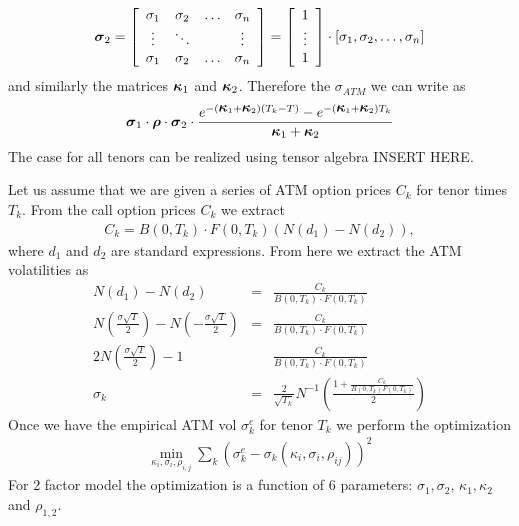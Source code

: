 \documentclass[12pt]{article}
\begin{document}
\begin{eqnarray*}
  \mbox {\boldmath ${\sigma}$}_2 = \left[ \begin{array}{cccc}
      \sigma_1 & \sigma_2 & \ldots & \sigma_n 
      \\
      \vdots & \ddots & & \vdots 
      \\
      \sigma_1 & \sigma_2 & \ldots & \sigma_n
    \end{array} 
  \right]
  = \left[ \begin{array}{c}
      1
      \\
      \vdots 
      \\
      1
    \end{array} 
  \right]
  \cdot 
  \left[ \sigma_1, \sigma_2, \ldots , \sigma_n \right]
\end{eqnarray*}
and similarly the matrices $\mbox {\boldmath ${\kappa}$}_1$ and $\mbox {\boldmath ${\kappa}$}_2$. 
Therefore the $\sigma_{ATM}$ we can write as 
\begin{eqnarray*}
  \mbox {\boldmath ${\sigma}$}_1 \cdot \mbox {\boldmath ${\rho}$} \cdot \mbox {\boldmath ${\sigma}$}_2  \cdot 
  \frac { e^{- (\mbox {\boldmath ${\kappa}$}_1 + \mbox {\boldmath ${\kappa}$}_2 ) (T_k - T)  } - e^{- (\mbox {\boldmath ${\kappa}$}_1 + \mbox {\boldmath ${\kappa}$}_2 ) T_k } }
    {\mbox {\boldmath ${\kappa}$}_1 + \mbox {\boldmath ${\kappa}$}_2 } 
\end{eqnarray*}
The case for all tenors can be realized using tensor algebra INSERT HERE. 

\vskip 5mm
%
\noindent
Let us assume that we are given a series of ATM option prices $C_k$ for tenor times $T_k$. From the call option prices $C_k$ we extract 
\begin{eqnarray*}
  C_k = B(0,T_k) \cdot F(0,T_k) ( N(d_1) - N(d_2) ),
\end{eqnarray*}
where $d_1$ and $d_2$ are standard expressions. From here we extract the ATM volatilities 
as 
\begin {eqnarray}
  N(d_1) - N(d_2) & = & \frac { C_k } { B(0,T_k) \cdot F(0,T_k) } 
  \nonumber
  \\
  N\left( \frac {\sigma \sqrt {T}} 2 \right) 
  - N \left( - \frac {\sigma \sqrt {T} } {2} \right) 
  & = & \frac { C_k } { B(0,T_k) \cdot F(0,T_k) } 
  \nonumber
  \\
  2 N \left( \frac {\sigma \sqrt {T}} 2 \right) - 1 & & 
  \frac { C_k } { B(0,T_k) \cdot F(0,T_k) } 
  \nonumber
  \\
  \sigma_k & = & \frac 2 { \sqrt {T_k} } N^{-1} 
  \left( 
  \frac {1 + \frac {C_k} {B(0,T_k) F(0,T_k)}} {2}
  \right)
  \label {implied_vol}
\end {eqnarray}
Once we have the empirical ATM vol $\sigma_k^e $ for tenor $T_k$ 
we perform the optimization 
\begin {eqnarray*}
  \min_{\kappa_i, \sigma_i, \rho_{i,j} } \sum_{k} (\sigma_k^e  - 
  \sigma_k (\kappa_i, \sigma_i, \rho_{ij} ) )^2 
\end {eqnarray*}
For $2$ factor model the optimization is a function of $6$ parameters: 
$\sigma_1, \sigma_2$, $ \kappa_1, \kappa_2 $ and $\rho_{1,2}$. 
\end{document}
